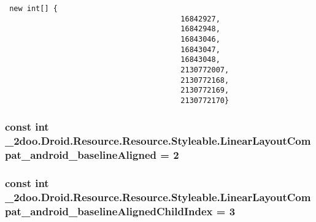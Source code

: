 \begin{Code}\begin{verbatim} new int[] {
                                        16842927,
                                        16842948,
                                        16843046,
                                        16843047,
                                        16843048,
                                        2130772007,
                                        2130772168,
                                        2130772169,
                                        2130772170}
\end{verbatim}
\end{Code}
\hypertarget{class__2doo_1_1_droid_1_1_resource_1_1_styleable_b05e90926a5ef9aa113fa0a472b0b80b}{
\subsubsection[{LinearLayoutCompat\_\-android\_\-baselineAligned}]{\setlength{\rightskip}{0pt plus 5cm}const int \_\-2doo.Droid.Resource.Resource.Styleable.LinearLayoutCompat\_\-android\_\-baselineAligned = 2}}
\label{class__2doo_1_1_droid_1_1_resource_1_1_styleable_b05e90926a5ef9aa113fa0a472b0b80b}


\hypertarget{class__2doo_1_1_droid_1_1_resource_1_1_styleable_39437a2cd57f8210d237605cd5097f0a}{
\subsubsection[{LinearLayoutCompat\_\-android\_\-baselineAlignedChildIndex}]{\setlength{\rightskip}{0pt plus 5cm}const int \_\-2doo.Droid.Resource.Resource.Styleable.LinearLayoutCompat\_\-android\_\-baselineAlignedChildIndex = 3}}
\label{class__2doo_1_1_droid_1_1_resource_1_1_styleable_39437a2cd57f8210d237605cd5097f0a}


